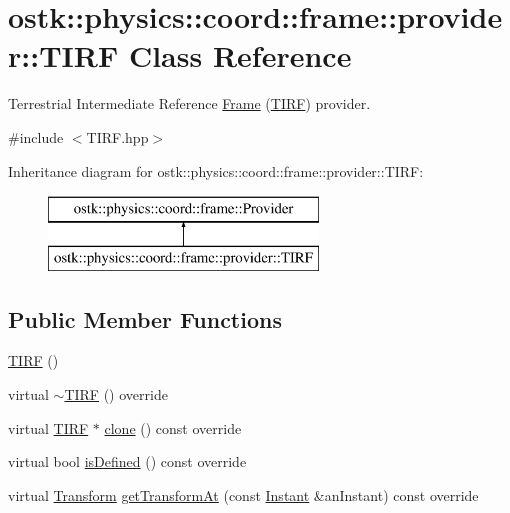 \hypertarget{classostk_1_1physics_1_1coord_1_1frame_1_1provider_1_1_t_i_r_f}{}\section{ostk\+:\+:physics\+:\+:coord\+:\+:frame\+:\+:provider\+:\+:T\+I\+RF Class Reference}
\label{classostk_1_1physics_1_1coord_1_1frame_1_1provider_1_1_t_i_r_f}


Terrestrial Intermediate Reference \hyperlink{classostk_1_1physics_1_1coord_1_1_frame}{Frame} (\hyperlink{classostk_1_1physics_1_1coord_1_1frame_1_1provider_1_1_t_i_r_f}{T\+I\+RF}) provider.  




{\ttfamily \#include $<$T\+I\+R\+F.\+hpp$>$}

Inheritance diagram for ostk\+:\+:physics\+:\+:coord\+:\+:frame\+:\+:provider\+:\+:T\+I\+RF\+:\begin{figure}[H]
\begin{center}
\leavevmode
\includegraphics[height=2.000000cm]{classostk_1_1physics_1_1coord_1_1frame_1_1provider_1_1_t_i_r_f}
\end{center}
\end{figure}
\subsection*{Public Member Functions}
\begin{DoxyCompactItemize}
\item 
\hyperlink{classostk_1_1physics_1_1coord_1_1frame_1_1provider_1_1_t_i_r_f_ae2db654a92bdf9d29692edb5f62501b8}{T\+I\+RF} ()
\item 
virtual \hyperlink{classostk_1_1physics_1_1coord_1_1frame_1_1provider_1_1_t_i_r_f_a9b0da0362415d6dc45c9112d62cac7e5}{$\sim$\+T\+I\+RF} () override
\item 
virtual \hyperlink{classostk_1_1physics_1_1coord_1_1frame_1_1provider_1_1_t_i_r_f}{T\+I\+RF} $\ast$ \hyperlink{classostk_1_1physics_1_1coord_1_1frame_1_1provider_1_1_t_i_r_f_ae29e3db5bd1bccbc69a507f8716b73e5}{clone} () const override
\item 
virtual bool \hyperlink{classostk_1_1physics_1_1coord_1_1frame_1_1provider_1_1_t_i_r_f_ac7f3d815a45e270adab07bf6f51dc25f}{is\+Defined} () const override
\item 
virtual \hyperlink{classostk_1_1physics_1_1coord_1_1_transform}{Transform} \hyperlink{classostk_1_1physics_1_1coord_1_1frame_1_1provider_1_1_t_i_r_f_a23d651ab9857ad748e6bf3815205cd72}{get\+Transform\+At} (const \hyperlink{classostk_1_1physics_1_1time_1_1_instant}{Instant} \&an\+Instant) const override
\end{DoxyCompactItemize}


